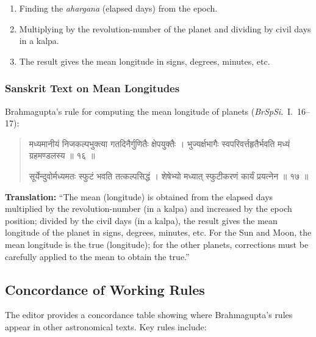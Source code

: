 \documentclass[11pt,a4paper]{article}
\newcommand{\dev}[1]{{\devanagarifont #1}}
\newenvironment{sanskritverse}{%
  \begin{quote}
  \devanagarifont
  \small
  \color{titlecolor}
}{\end{quote}}
\theoremstyle{definition}
\begin{document}
\begin{enumerate}
  \item Finding the \textit{ahargana} (elapsed days) from the epoch.
  \item Multiplying by the revolution-number of the planet and dividing by civil days in a kalpa.
  \item The result gives the mean longitude in signs, degrees, minutes, etc.
\end{enumerate}


\subsubsection{Sanskrit Text on Mean Longitudes}

Brahmagupta's rule for computing the mean longitude of planets (\textit{BrSpSi}.\ I.\ 16--17):

\begin{sanskritverse}
\dev{मध्यमानीयं निजकल्पभुक्त्या गतदिनैर्गुणितैः क्षेपयुक्तैः ।}
\dev{भुज्यर्क्षभागैः स्वपरिवर्त्तहृतैर्भवति मध्यं ग्रहमण्डलस्य ॥ १६ ॥}

\dev{सूर्येन्दुवोर्मध्यमतः स्फुटं भवति तत्कल्पसिद्धं ।}
\dev{शेषेभ्यो मध्यात् स्फुटीकरणं कार्यं प्रयत्नेन ॥ १७ ॥}
\end{sanskritverse}

\textbf{Translation:} ``The mean (longitude) is obtained from the elapsed days multiplied by the revolution-number (in a kalpa) and increased by the epoch position; divided by the civil days (in a kalpa), the result gives the mean longitude of the planet in signs, degrees, minutes, etc. For the Sun and Moon, the mean longitude is the true (longitude); for the other planets, corrections must be carefully applied to the mean to obtain the true.''

\vspace{0.3cm}

\subsection{Concordance of Working Rules}

The editor provides a concordance table showing where Brahmagupta's rules appear in other astronomical texts. Key rules include:
\end{document}

